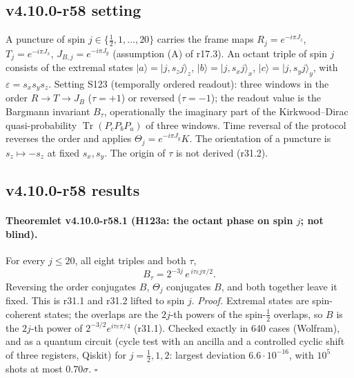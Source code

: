 \subsection*{v4.10.0-r58 setting}
\label{subsec:v4100-r58-setting}

A puncture of spin \(j\in\{\tfrac12,1,\dots,20\}\) carries the frame maps \(R_j=e^{-i\pi J_z}\), \(T_j=e^{-i\pi J_x}\), \(J_{B,j}=e^{-i\pi J_y}\) (assumption (A) of r17.3).
An octant triple of spin \(j\) consists of the extremal states \(|a\rangle=|j,s_zj\rangle_z\), \(|b\rangle=|j,s_xj\rangle_x\), \(|c\rangle=|j,s_yj\rangle_y\), with
\(\varepsilon=s_xs_ys_z\).  Setting S123 (temporally ordered readout): three windows in the order \(R\to T\to J_B\) (\(\tau=+1\)) or reversed (\(\tau=-1\)); the
readout value is the Bargmann invariant \(B_\tau\), operationally the imaginary part of the Kirkwood--Dirac quasi-probability \(\operatorname{Tr}(P_cP_bP_a)\)
of three windows.  Time reversal of the protocol reverses the order and applies \(\Theta_j=e^{-i\pi J_y}K\).  The orientation of a puncture is
\(s_z\mapsto-s_z\) at fixed \(s_x,s_y\).  The origin of \(\tau\) is not derived (r31.2).

\subsection*{v4.10.0-r58 results}
\label{subsec:v4100-r58-results}

\paragraph{Theoremlet v4.10.0-r58.1 (H123a: the octant phase on spin \(j\); not blind).}
For every \(j\le20\), all eight triples and both \(\tau\),
\[
B_\tau=2^{-3j}\,e^{\,i\tau\varepsilon j\pi/2}.
\]
Reversing the order conjugates \(B\), \(\Theta_j\) conjugates \(B\), and both together leave it fixed.  This is r31.1 and r31.2 lifted to spin \(j\).
\emph{Proof.} Extremal states are spin-coherent states; the overlaps are the \(2j\)-th powers of the spin-\(\tfrac12\) overlaps, so \(B\) is the \(2j\)-th power of
\(2^{-3/2}e^{i\tau\varepsilon\pi/4}\) (r31.1).  Checked exactly in 640 cases (Wolfram), and as a quantum circuit (cycle test with an ancilla and a
controlled cyclic shift of three registers, Qiskit) for \(j=\tfrac12,1,2\): largest deviation \(6.6\cdot10^{-16}\), with \(10^5\) shots at most \(0.70\sigma\).  \(\square\)

